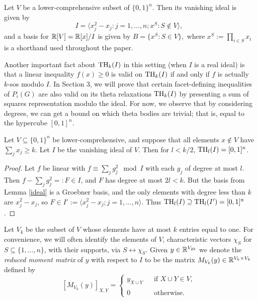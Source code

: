 \begin{lemma} \label{ideal}
Let $V$ be a lower-comprehensive subset of $\{0,1\}^n$. Then its vanishing ideal is given by
$$I=\langle x_j^2 - x_j: j = 1, \ldots, n;
x^S: S \notin V\rangle,$$ and a basis for $\mathbb{R}[V] = \mathbb{R}[x]/I$ is given by $B = \{x^S: S \in V\},$
where $x^S := \prod_{i \in S} x_i$ is a shorthand used throughout the paper.
\end{lemma}

Another important fact about $\textup{TH}_k(I)$ in this setting (when $I$ is a real ideal) is that a linear inequality $f(x) \geq 0$ is valid on $\textup{TH}_k(I)$ if and only if $f$ is actually $k$-sos modulo $I$.
In Section 3, we will prove that certain facet-defining inequalities of $P_i(G)$ are also valid on its theta relaxations $\textup{TH}_k(I)$ by presenting a sum of squares representation modulo the ideal. For now, we observe that by considering degrees, we can get a bound on which theta bodies are trivial; that is, equal to the hypercube $[0,1]^n$.

\begin{lemma} \label{lowerbound}
Let $V \subseteq \{0,1\}^n$ be lower-comprehensive, and suppose that all elements $x
\notin V$ have $\sum_j x_j \ge k$. Let $I$ be the vanishing ideal of $V$. Then 
for $l < k/2$, $\textup{TH}_l(I) = [0,1]^n$.
\end{lemma}
\begin{proof}
Let $f$ be linear with $f \equiv \sum_j g_j^2 \mod I$ with each $g_j$ of degree
at most $l$. Then $f - \sum_j g_j^2 =: F \in I$, and $F$ has degree at most $2l
< k$. But the basis from Lemma \ref{ideal} is a Groebner basis, and the only
elements with degree less than $k$ are $x_j^2 - x_j$, so $F \in I' := \langle x_j^2 - x_j ;j = 1, \ldots, n\rangle$. Thus $\textup{TH}_l(I) \supseteq \textup{TH}_l(I') = [0,1]^n$.
\end{proof}


Let $V_k$ be the subset of $V$ whose elements have at most $k$ entries equal to one. For convenience, we will often identify the elements of $V$, characteristic vectors $\chi_S$ for $S \subseteq \{1,\ldots,n\}$, with their supports, via $S \leftrightarrow \chi_S$. Given $y \in \mathbb{R}^{V_{2k}}$ we denote the {\em reduced 
moment matrix} of $y$ with respect to $I$ to be the matrix $M_{V_k}(y) \in \mathbb{R}^{V_k \times V_k}$ defined by 
$$[M_{V_k}(y)]_{X,Y}=
\left\{  
\begin{array}{ll} 
y_{X \cup Y} & \ \ \textrm{ if } X \cup Y \in V, \\
\\
0            & \ \ \textrm{ otherwise. }   
\end{array} 
\right.$$

